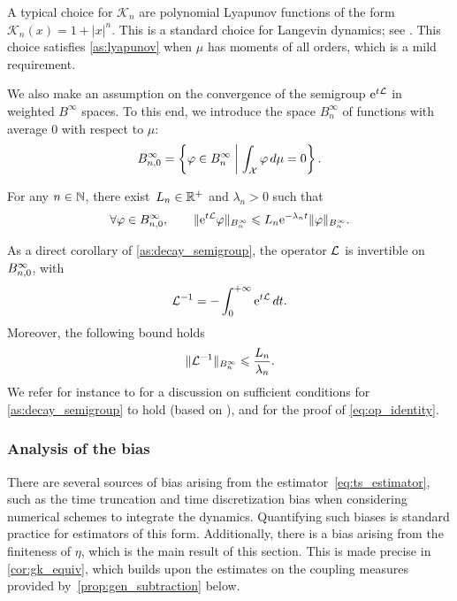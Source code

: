A typical choice for $\mathcal{K}_n$ are polynomial Lyapunov functions of the form $\mathcal{K}_n(x) = 1+|x|^n$. This is a standard choice for Langevin dynamics; see \cite{mattingly2002,talay2002}. This choice satisfies \cref{as:lyapunov} when $\mu$ has moments of all orders, which is a mild requirement.

We also make an assumption on the convergence of the semigroup $\mathrm{e}^{t\mathcal{L}}$ in weighted $B^\infty$ spaces. To this end, we introduce the space $B^\infty_n$ of functions with average 0 with respect to $\mu$:
%
\begin{equation}
    B_{n,0}^{\infty} = \left\{\varphi \in B^\infty_n \; \middle| \; \int_\mathcal{X} \varphi \, d\mu = 0\right\}.
\end{equation}
%

\begin{assumption}
	\label{as:decay_semigroup}
	For any $n\in\mathbb{N}$, there exist~$L_n \in \mathbb{R}^+$ and $\lambda_n>0$ such that
	\begin{equation}
		\forall \varphi\in B_{n,0}^{\infty}, \qquad \|\mathrm{e}^{t\mathcal{L}}\varphi\|_{B^\infty_n} \leqslant L_n\mathrm{e}^{-\lambda_n t}\lVert\varphi\rVert_{B^\infty_n}.
	\label{eq:decay}
	\end{equation}
\end{assumption}
%

As a direct corollary of \cref{as:decay_semigroup}, the operator $\mathcal{L}$ is invertible on $B_{n,0}^{\infty}$, with
%
\begin{equation}
	\mathcal{L}^{-1} = -\int_0^{+\infty} \mathrm{e}^{t\mathcal{L}} \, dt.
	\label{eq:op_identity}
\end{equation}
%
Moreover, the following bound holds
%
\begin{equation}
	\lVert\mathcal{L}^{-1}\rVert_{B^\infty_n} \leqslant \frac{L_n}{\lambda_n}.
	\label{eq:Linv_bound}
\end{equation}
%
We refer for instance to \cite[Section 2]{acta_numerica2016} for a discussion on sufficient conditions for \cref{as:decay_semigroup} to hold (based on \cite{luc2006,mattingly2011}), and for the proof of \eqref{eq:op_identity}. 

\subsubsection{Analysis of the bias}
\label{subsubsec:bias_analysis}
%
There are several sources of bias arising from the estimator~\eqref{eq:ts_estimator}, such as the time truncation and time discretization bias when considering numerical schemes to integrate the dynamics. Quantifying such biases is standard practice for estimators of this form. Additionally, there is a bias arising from the finiteness of $\eta$, which is the main result of this section. This is made precise in \cref{cor:gk_equiv}, which builds upon the estimates on the coupling measures provided by~\cref{prop:gen_subtraction} below. 

